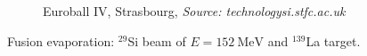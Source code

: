 \documentclass{beamer}
\begin{document}
\begin{frame}
\begin{columns}
\begin{column}{0.4\textwidth}
\begin{figure}
				{\footnotesize Euroball IV, Strasbourg, \textit{Source: technologysi.stfc.ac.uk}}
			\end{figure}
			{\footnotesize Fusion evaporation: $^{29}$Si beam of $E=152\ \text{MeV}$ and $^{139}$La target.}
		\end{column}
	\end{columns}
\end{frame}



\end{document}
